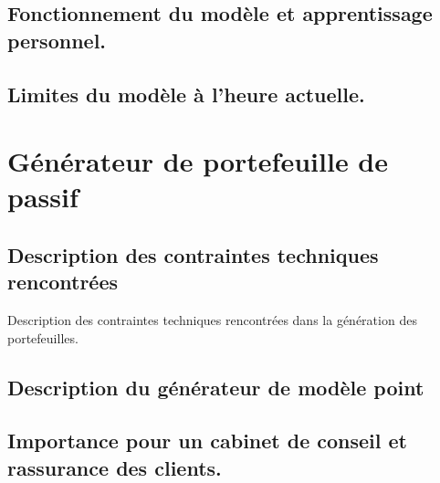 \subsection{Fonctionnement du modèle et apprentissage personnel.}
\subsection{Limites du modèle à l’heure actuelle.}

\section{Générateur de portefeuille de passif}
\subsection{Description des contraintes techniques rencontrées}
Description des contraintes techniques rencontrées dans la génération des portefeuilles.

\subsection{Description du générateur de modèle point}
\subsection{Importance pour un cabinet de conseil et rassurance des clients.}